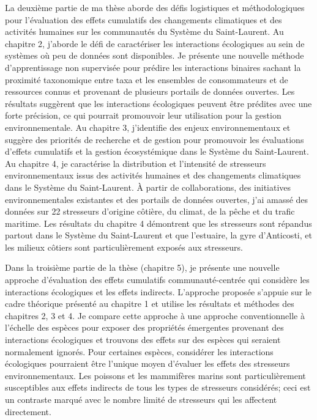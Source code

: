 La deuxième partie de ma thèse aborde des défis logistiques et
méthodologiques pour l'évaluation des effets cumulatifs des changements
climatiques et des activités humaines sur les communautés du Système du
Saint-Laurent. Au chapitre 2, j'aborde le défi de caractériser les
interactions écologiques au sein de systèmes où peu de données sont
disponibles. Je présente une nouvelle méthode d'apprentissage non
supervisée pour prédire les interactions binaires sachant la proximité
taxonomique entre taxa et les ensembles de consommateurs et de
ressources connus et provenant de plusieurs portails de données
ouvertes. Les résultats suggèrent que les interactions écologiques
peuvent être prédites avec une forte précision, ce qui pourrait
promouvoir leur utilisation pour la gestion environnementale. Au
chapitre 3, j'identifie des enjeux environnementaux et suggère des
priorités de recherche et de gestion pour promouvoir les évaluations
d'effets cumulatifs et la gestion écosystémique dans le Système du
Saint-Laurent. Au chapitre 4, je caractérise la distribution et
l'intensité de stresseurs environnementaux issus des activités humaines
et des changements climatiques dans le Système du Saint-Laurent. À
partir de collaborations, des initiatives environnementales existantes
et des portails de données ouvertes, j'ai amassé des données sur 22
stresseurs d'origine côtière, du climat, de la pêche et du trafic
maritime. Les résultats du chapitre 4 démontrent que les stresseurs sont
répandus partout dans le Système du Saint-Laurent et que l'estuaire, la
gyre d'Anticosti, et les milieux côtiers sont particulièrement exposés
aux stresseurs.

Dans la troisième partie de la thèse (chapitre 5), je présente une
nouvelle approche d'évaluation des effets cumulatifs communauté-centrée
qui considère les interactions écologiques et les effets indirects.
L'approche proposée s'appuie sur le cadre théorique présenté au chapitre
1 et utilise les résultats et méthodes des chapitres 2, 3 et 4. Je
compare cette approche à une approche conventionnelle à l'échelle des
espèces pour exposer des propriétés émergentes provenant des
interactions écologiques et trouvons des effets sur des espèces qui
seraient normalement ignorés. Pour certaines espèces, considérer les
interactions écologiques pourraient être l'unique moyen d'évaluer les
effets des stresseurs environnementaux. Les poissons et les mammifères
marins sont particulièrement susceptibles aux effets indirects de tous
les types de stresseurs considérés; ceci est un contraste marqué avec le
nombre limité de stresseurs qui les affectent directement.

